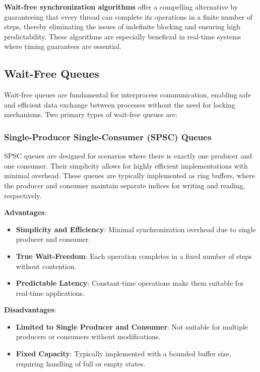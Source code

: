 \documentclass[ a4paper,
                toc=bibliography
              ]{scrartcl}
\begin{document}
\textbf{Wait-free synchronization algorithms} offer a compelling alternative by guaranteeing that every thread can complete its operations in a finite number of steps, thereby eliminating the issues of indefinite blocking and ensuring high predictability. These algorithms are especially beneficial in real-time systems where timing guarantees are essential. \cite{kogan2012methodology,herlihy1991wait}

\subsection{Wait-Free Queues}

Wait-free queues are fundamental for interprocess communication, enabling safe and efficient data exchange between processes without the need for locking mechanisms. Two primary types of wait-free queues are:

\subsubsection{Single-Producer Single-Consumer (SPSC) Queues}

SPSC queues are designed for scenarios where there is exactly one producer and one consumer. Their simplicity allows for highly efficient implementations with minimal overhead. These queues are typically implemented as ring buffers, where the producer and consumer maintain separate indices for writing and reading, respectively.

\textbf{Advantages}:
\begin{itemize}
	\item \textbf{Simplicity and Efficiency}: Minimal synchronization overhead due to single producer and consumer.
	\item \textbf{True Wait-Freedom}: Each operation completes in a fixed number of steps without contention.
	\item \textbf{Predictable Latency}: Constant-time operations make them suitable for real-time applications.
\end{itemize}

\textbf{Disadvantages}:
\begin{itemize}
	\item \textbf{Limited to Single Producer and Consumer}: Not suitable for multiple producers or consumers without modifications.
	\item \textbf{Fixed Capacity}: Typically implemented with a bounded buffer size, requiring handling of full or empty states.
\end{itemize}
\cite{dolz2016SPSC,torquati2010singleproducersingleconsumerqueuessharedcache}
\end{document}
